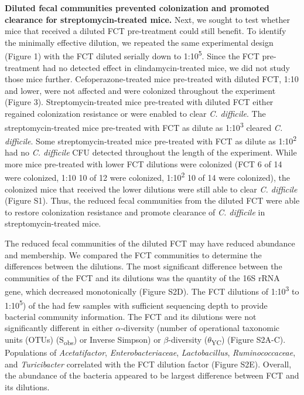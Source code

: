 \documentclass[
  12pt,
]{article}
\begin{document}
\textbf{Diluted fecal communities prevented colonization and promoted
clearance for streptomycin-treated mice.} Next, we sought to test
whether mice that received a diluted FCT pre-treatment could still
benefit. To identify the minimally effective dilution, we repeated the
same experimental design (Figure 1) with the FCT diluted serially down
to 1:10\textsuperscript{5}. Since the FCT pre-treatment had no detected
effect in clindamycin-treated mice, we did not study those mice further.
Cefoperazone-treated mice pre-treated with diluted FCT, 1:10 and lower,
were not affected and were colonized throughout the experiment (Figure
3). Streptomycin-treated mice pre-treated with diluted FCT either
regained colonization resistance or were enabled to clear \emph{C.
difficile}. The streptomycin-treated mice pre-treated with FCT as dilute
as 1:10\textsuperscript{3} cleared \emph{C. difficile}. Some
streptomycin-treated mice pre-treated with FCT as dilute as
1:10\textsuperscript{2} had no \emph{C. difficile} CFU detected
throughout the length of the experiment. While more mice pre-treated
with lower FCT dilutions were colonized (FCT 6 of 14 were colonized,
1:10 10 of 12 were colonized, 1:10\textsuperscript{2} 10 of 14 were
colonized), the colonized mice that received the lower dilutions were
still able to clear \emph{C. difficile} (Figure S1). Thus, the reduced
fecal communities from the diluted FCT were able to restore colonization
resistance and promote clearance of \emph{C. difficile} in
streptomycin-treated mice.

The reduced fecal communities of the diluted FCT may have reduced
abundance and membership. We compared the FCT communities to determine
the differences between the dilutions. The most significant difference
between the communities of the FCT and its dilutions was the quantity of
the 16S rRNA gene, which decreased monotonically (Figure S2D). The FCT
dilutions of 1:10\textsuperscript{3} to 1:10\textsuperscript{5}) of the
had few samples with sufficient sequencing depth to provide bacterial
community information. The FCT and its dilutions were not significantly
different in either \(\alpha\)-diversity (number of operational
taxonomic units (OTUs) (S\textsubscript{obs}) or Inverse Simpson) or
\(\beta\)-diversity (\(\theta\)\textsubscript{YC}) (Figure S2A-C).
Populations of \emph{Acetatifactor}, \emph{Enterobacteriaceae},
\emph{Lactobacillus}, \emph{Ruminococcaceae}, and \emph{Turicibacter}
correlated with the FCT dilution factor (Figure S2E). Overall, the
abundance of the bacteria appeared to be largest difference between FCT
and its dilutions.
\end{document}
